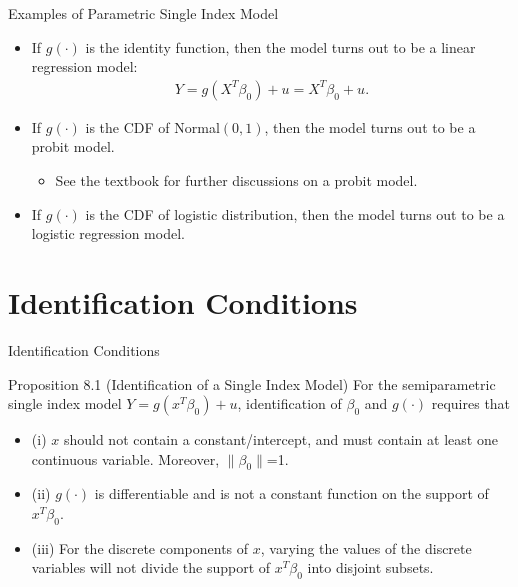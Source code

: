 \documentclass[xcolor=svgnames,dvipdfmx,cjk]{beamer}
\theoremstyle{example}
\begin{document}
\begin{frame}{Examples of Parametric Single Index Model}
  \begin{itemize}
    \item If $g(\cdot)$ is the identity function, 
          then the model turns out to be \alert{a linear regression model}:
          \begin{align*}
            Y = g (X^{T} \beta_0) + u = X^{T} \beta_0 + u.
          \end{align*}
    \item If $g(\cdot)$ is the CDF of Normal$(0, 1)$,
          then the model turns out to be \alert{a probit model}.
          \begin{itemize}
            \item See the textbook for further discussions on a probit model.
          \end{itemize}
    \item If $g(\cdot)$ is the CDF of logistic distribution,
          then the model turns out to be \alert{a logistic regression model}.
  \end{itemize}
  
\end{frame}


\section{Identification Conditions}

\begin{frame}{Identification Conditions}
  \begin{itembox}[l]{Proposition 8.1 (Identification of a Single Index Model)}
    \quad 
    For the semiparametric single index model $Y = g(x^{T} \beta_0) + u$,
    identification of $\beta_0$ and $g(\cdot)$ requires that
    \begin{itemize}
      \item (i)
            $x$ should not contain a constant/intercept, 
            and must contain at least one continuous variable.
            Moreover, $\|\beta_0\|$=1.
      \item (ii)
            $g(\cdot)$ is differentiable 
            and is not a constant function on the support of $x^{T}\beta_0$.
      \item (iii)
            For the discrete components of $x$, 
            varying the values of the discrete variables will not divide the support of $x^{T}\beta_0$ into disjoint subsets.
    \end{itemize}
  \end{itembox}
\end{frame}
\end{document}
